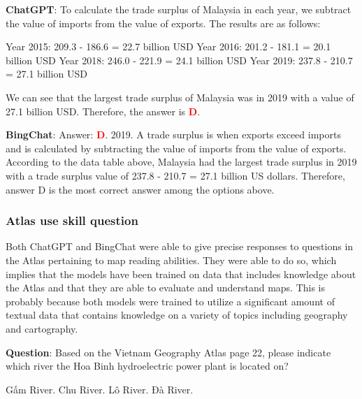 \documentclass{article}
\begin{document}
{\begin{mdframed}[linewidth=1pt,linecolor=red]
		\textbf{ChatGPT}: To calculate the trade surplus of Malaysia in each year, we subtract the value of imports from the value of exports. The results are as follows:
		
		Year 2015: 209.3 - 186.6 = 22.7 billion USD
		Year 2016: 201.2 - 181.1 = 20.1 billion USD
		Year 2018: 246.0 - 221.9 = 24.1 billion USD
		Year 2019: 237.8 - 210.7 = 27.1 billion USD
		
		We can see that the largest trade surplus of Malaysia was in 2019 with a value of 27.1 billion USD. Therefore, the answer is \textcolor{red}{\textbf{D}}.
		
		
		\textbf{BingChat}: Answer: \textcolor{red}{\textbf{D}}. 2019. A trade surplus is when exports exceed imports and is calculated by subtracting the value of imports from the value of exports. According to the data table above, Malaysia had the largest trade surplus in 2019 with a trade surplus value of 237.8 - 210.7 = 27.1 billion US dollars. Therefore, answer D is the most correct answer among the options above.
		
		
	\end{mdframed}	
	
	\subsubsection{Atlas use skill question}
	\label{VNHSGE_Geo_Atlas}
	
	Both ChatGPT and BingChat were able to give precise responses to questions in the Atlas pertaining to map reading abilities. They were able to do so, which implies that the models have been trained on data that includes knowledge about the Atlas and that they are able to evaluate and understand maps. This is probably because both models were trained to utilize a significant amount of textual data that contains knowledge on a variety of topics including geography and cartography.
	
	
	
	\begin{mdframed}[linewidth=1pt,linecolor=red] \textbf{Question}: Based on the Vietnam Geography Atlas page 22, please indicate which river the Hoa Binh hydroelectric power plant is located on?
		
		
		
		\begin{oneparchoices}
			\choice Gấm River.
			\choice Chu River.
			\choice Lô River.
			\choice Đà River.
		\end{oneparchoices}
		

\end{mdframed}}
\end{document}
